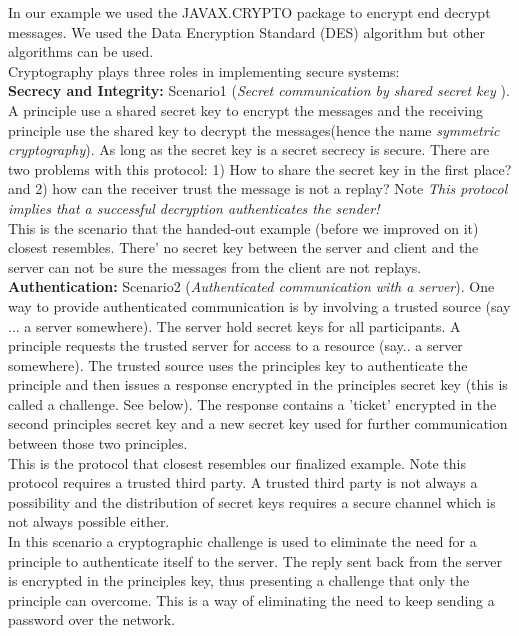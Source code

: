 In our example we used the JAVAX.CRYPTO package to encrypt end decrypt messages. We used the Data Encryption Standard (DES) algorithm but other algorithms can be used.\\

Cryptography plays three roles in implementing secure systems:\\

\textbf{Secrecy and Integrity:} Scenario1 (\textit{Secret communication by shared secret key }). A principle use a shared secret key to encrypt the messages and the receiving principle use the shared key to decrypt the messages(hence the name \textit{symmetric cryptography}). As long as the secret key is a secret secrecy is secure. There are two problems with this protocol: 1) How to share the secret key in the first place? and 2) how can the receiver trust the message is not a replay? Note \textit{This protocol implies that a successful decryption authenticates the sender!} \\

This is the scenario that the handed-out example (before we improved on it) closest resembles. There' no secret key between the server and client and the server can not be sure the messages from the client are not replays. \\

\textbf{Authentication:} Scenario2 (\textit{Authenticated communication with a server}). One way to provide authenticated communication is by involving a trusted source (say ... a server somewhere). The server hold secret keys for all participants. A principle requests the trusted server for access to a resource (say.. a server somewhere). The trusted source uses the principles key to authenticate the principle and then issues a response encrypted in the principles secret key (this is called a challenge. See below). The response contains a 'ticket' encrypted in the second principles secret key and a new secret key used for further communication between those two principles. \\ 

This is the protocol that closest resembles our finalized example. Note this protocol requires a trusted third party. A trusted third party is not always a possibility and the distribution of secret keys requires a secure channel which is not always possible either. \\

In this scenario a cryptographic challenge is used to eliminate the need for a principle to authenticate itself to the server. The reply sent back from the server is encrypted in the principles key, thus presenting a challenge that only the principle can overcome. This is a way of eliminating the need to keep sending a password over the network.\\

